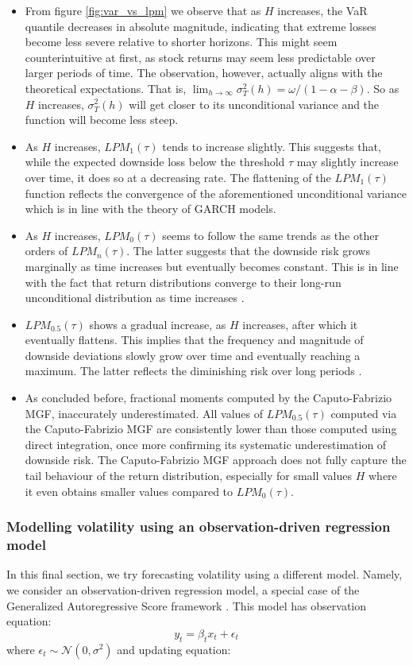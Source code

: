 \begin{itemize}
    \item From figure \ref{fig:var_vs_lpm} we observe that as \(H\) increases, the VaR quantile decreases in absolute magnitude, indicating that extreme losses become less severe relative to shorter horizons. This might seem counterintuitive at first, as stock returns may seem less predictable over larger periods of time. The observation, however, actually aligns with the theoretical expectations. That is, \(\lim_{h \to \infty} \sigma^2_T(h) = \omega /(1 - \alpha - \beta)\). So as \(H\) increases, \(\sigma^2_T(h)\) will get closer to its unconditional variance and the function will become less steep.
\item As \(H\) increases, \(LPM_1(\tau)\) tends to increase slightly. This suggests that, while the expected downside loss below the threshold \(\tau\) may slightly increase over time, it does so at a decreasing rate. The flattening of the \(LPM_1(\tau)\) function reflects the convergence of the aforementioned unconditional variance which is in line with the theory of GARCH models.
\item As \(H\) increases, \(LPM_0(\tau)\) seems to follow the same trends as the other orders of \(LPM_n(\tau)\). The latter suggests that the downside risk grows marginally as time increases but eventually becomes constant. This is in line with the fact that return distributions converge to their long-run unconditional distribution as time increases \citep{hamilton1994}.
\item \(LPM_{0.5}(\tau)\) shows a gradual increase, as \(H\) increases, after which it eventually flattens. This implies that the frequency and magnitude of downside deviations slowly grow over time and eventually reaching a maximum. The latter reflects the diminishing risk over long periods \citep{sortino1991}.
\item As concluded before, fractional moments computed by the Caputo-Fabrizio MGF, inaccurately underestimated. All values of \(LPM_{0.5}(\tau)\) computed via the Caputo-Fabrizio MGF are consistently lower than those computed using direct integration, once more confirming its systematic underestimation of downside risk. The Caputo-Fabrizio MGF approach does not fully capture the tail behaviour of the return distribution, especially for small values \(H\) where it even obtains smaller values compared to \(LPM_0(\tau)\).
\end{itemize}

\subsubsection{Modelling volatility using an observation-driven regression model}
In this final section, we try forecasting volatility using a different model. Namely, we consider an observation-driven regression model, a special case of the Generalized Autoregressive Score framework \citep{creal2013}.
This model has observation equation:
\begin{equation}
    y_t = \beta_t x_t + \epsilon_t
\end{equation}  
where \(\epsilon_t \sim \mathcal{N}(0, \sigma^2)\) and updating equation:

